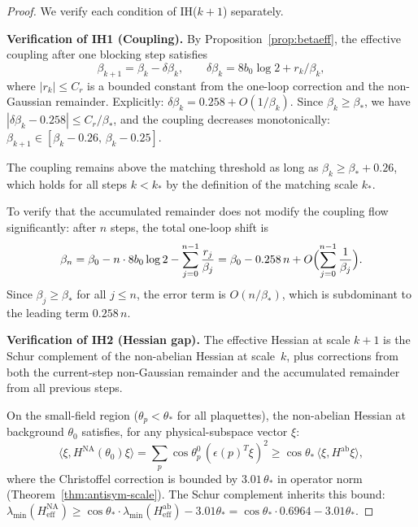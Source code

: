 \documentclass[11pt]{article}
\theoremstyle{definition}
\begin{document}
\begin{proof}
We verify each condition of IH($k+1$) separately.

\medskip\noindent\textbf{Verification of IH1 (Coupling).}
By Proposition~\ref{prop:betaeff}, the effective coupling after one
blocking step satisfies
\begin{equation}
\beta_{k+1}=\beta_k-\delta\beta_k,\qquad
\delta\beta_k=8b_0\log 2+r_k/\beta_k,
\end{equation}
where $|r_k|\le C_r$ is a bounded constant from the one-loop
correction and the non-Gaussian remainder.  Explicitly:
$\delta\beta_k=0.258+O(1/\beta_k)$.  Since $\beta_k\ge\beta_*$, we have
$|\delta\beta_k-0.258|\le C_r/\beta_*$, and the coupling decreases
monotonically: $\beta_{k+1}\in[\beta_k-0.26,\,\beta_k-0.25]$.

The coupling remains above the matching threshold as long as
$\beta_k\ge\beta_*+0.26$, which holds for all steps $k<k_*$ by
the definition of the matching scale $k_*$.

To verify that the accumulated remainder does not modify the coupling
flow significantly: after $n$ steps, the total one-loop shift is
\begin{equation}
\beta_n=\beta_0-n\cdot 8b_0\log 2
-\sum_{j=0}^{n-1}\frac{r_j}{\beta_j}
=\beta_0-0.258\,n+O\Bigl(\sum_{j=0}^{n-1}\frac{1}{\beta_j}\Bigr).
\end{equation}
Since $\beta_j\ge\beta_*$ for all $j\le n$, the error term is
$O(n/\beta_*)$, which is subdominant to the leading term $0.258\,n$.

\medskip\noindent\textbf{Verification of IH2 (Hessian gap).}
The effective Hessian at scale $k+1$ is the Schur complement of the
non-abelian Hessian at scale~$k$, plus corrections from both the
current-step non-Gaussian remainder and the accumulated remainder
from all previous steps.

On the small-field region ($\theta_p<\theta_*$ for all plaquettes),
the non-abelian Hessian at background $\theta_0$ satisfies, for any
physical-subspace vector $\xi$:
\begin{equation}
\langle\xi,H^{\mathrm{NA}}(\theta_0)\xi\rangle
=\sum_p\cos\theta_p^0\,(\epsilon(p)^T\xi)^2
\ge\cos\theta_*\,\langle\xi,H^{\mathrm{ab}}\xi\rangle,
\end{equation}
where the Christoffel correction is bounded by
$3.01\,\theta_*$ in operator norm
(Theorem~\ref{thm:antisym-scale}).  The Schur complement inherits
this bound: $\lambda_{\min}(H_{\mathrm{eff}}^{\mathrm{NA}})
\ge\cos\theta_*\cdot\lambda_{\min}(H_{\mathrm{eff}}^{\mathrm{ab}})
-3.01\theta_*
=\cos\theta_*\cdot 0.6964-3.01\theta_*$.


\end{proof}
\end{document}
